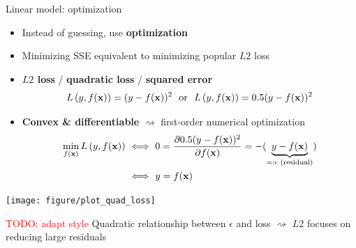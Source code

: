 \documentclass[11pt,compress,t,notes=noshow, xcolor=table]{beamer}
\begin{document}
\begin{vbframe}{Linear model: optimization}

\begin{itemize}
    \item Instead of guessing, use \textbf{optimization}
    \item Minimizing SSE equivalent to minimizing popular $L2$ loss
    \item \textbf{$L2$ loss} / \textbf{quadratic loss} / \textbf{squared error}
    $$L\left(y, f(\mathbf{x})\right) = (y-f(\mathbf{x}))^2 ~~ \text{or} ~~ L\left(y, f(\mathbf{x})\right) = 0.5 (y-f(\mathbf{x}))^2$$
    \item \textbf{Convex \& differentiable} $\rightsquigarrow$ first-order 
    numerical optimization
    \begin{align*}
        \min_{f(\mathbf{x})} L\left(y, f(\mathbf{x})\right) ~&\Longleftrightarrow ~ 0 = \frac{\partial{0.5 (y-f(\mathbf{x}))^2}}{\partial f(\mathbf{x})} 
        = -(\underbrace{y - f(\mathbf{x})}_{=: \epsilon \text{ (residual)}}) \\
        &\Longleftrightarrow ~ y = f(\mathbf{x})
    \end{align*}
    \normalsize
\end{itemize}

\begin{minipage}{0.65\textwidth}
    \texttt{[image: figure/plot\_quad\_loss]} 
\end{minipage}
\begin{minipage}{0.3\textwidth}
    \footnotesize \raggedright
    \textcolor{red}{\footnotesize TODO: adapt style}
    Quadratic relationship between $\epsilon$ and loss $\rightsquigarrow$ 
    $L2$ focuses on reducing large residuals
\end{minipage}

\end{vbframe}

\end{document}
